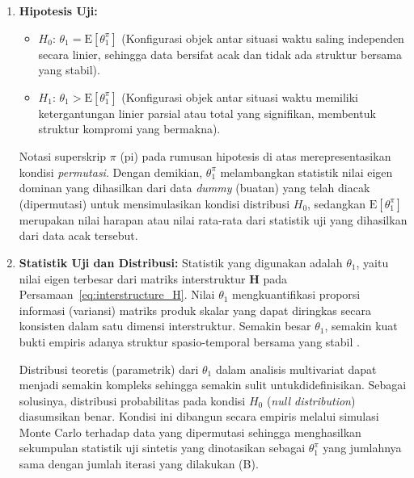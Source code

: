 \begin{enumerate}
    \item \textbf{Hipotesis Uji:}
    \begin{itemize}
        \item $H_0$: $\theta_1 = \mathrm{E}\left[\theta_1^{\pi}\right]$ (Konfigurasi objek antar situasi waktu saling independen secara linier, sehingga data bersifat acak dan tidak ada struktur bersama yang stabil).
        \item $H_1$: $\theta_1 > \mathrm{E}\left[\theta_1^{\pi}\right]$ (Konfigurasi objek antar situasi waktu memiliki ketergantungan linier parsial atau total yang signifikan, membentuk struktur kompromi yang bermakna).
    \end{itemize}
    Notasi superskrip $\pi$ (pi) pada rumusan hipotesis di atas merepresentasikan kondisi \textit{permutasi}. Dengan demikian, $\theta_1^{\pi}$ melambangkan statistik nilai eigen dominan yang dihasilkan dari data \textit{dummy} (buatan) yang telah diacak (dipermutasi) untuk mensimulasikan kondisi distribusi $H_0$, sedangkan $\mathrm{E}\left[\theta_1^{\pi}\right]$ merupakan nilai harapan atau nilai rata-rata dari statistik uji yang dihasilkan dari data acak tersebut.

    \item \textbf{Statistik Uji dan Distribusi:}
    Statistik yang digunakan adalah $\theta_1$, yaitu nilai eigen terbesar dari matriks interstruktur $\mathbf{H}$ pada Persamaan~\eqref{eq:interstructure_H}. Nilai $\theta_1$ mengkuantifikasi proporsi informasi (variansi) matriks produk skalar yang dapat diringkas secara konsisten dalam satu dimensi interstruktur. Semakin besar $\theta_1$, semakin kuat bukti empiris adanya struktur spasio-temporal bersama yang stabil \citep{abdi2012}.
    
    Distribusi teoretis (parametrik) dari $\theta_1$ dalam analisis multivariat dapat menjadi semakin kompleks sehingga semakin sulit untukdidefinisikan. Sebagai solusinya, distribusi probabilitas pada kondisi $H_0$ (\textit{null distribution}) diasumsikan benar. Kondisi ini dibangun secara empiris melalui simulasi Monte Carlo terhadap data yang dipermutasi sehingga menghasilkan sekumpulan statistik uji sintetis yang dinotasikan sebagai $\theta_1^{\pi}$ yang jumlahnya sama dengan jumlah iterasi yang dilakukan (B).
    

\end{enumerate}
